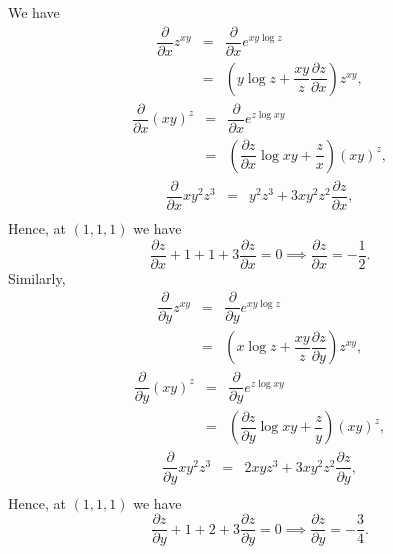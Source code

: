 \begin{solu}
We have
$$\begin{array}{lll} \dfrac{\partial }{\partial x} z^{xy}   & =  &  \dfrac{\partial }{\partial x} e^{xy\log z} \\
& = & \left(y\log z + \dfrac{xy}{z}\dfrac{\partial z}{\partial
x}\right)z^{xy},
\end{array}  $$
$$\begin{array}{lll} \dfrac{\partial }{\partial x} (xy)^z   & =  &  \dfrac{\partial }{\partial x} e^{z\log xy} \\
& = & \left(\dfrac{\partial z}{\partial x} \log xy +
\dfrac{z}{x}\right)(xy)^z,
\end{array}  $$
$$\begin{array}{lll} \dfrac{\partial }{\partial x} xy^2z^3   & =  &  y^2z^3 + 3xy^2z^2\dfrac{\partial z}{\partial
x},\\
\end{array}  $$
Hence, at $(1,1,1)$ we have
$$\dfrac{\partial z}{\partial x} + 1 + 1 +3\dfrac{\partial z}{\partial x} = 0 \implies \dfrac{\partial z}{\partial x} = -\dfrac{1}{2}.
 $$
Similarly,
$$\begin{array}{lll} \dfrac{\partial }{\partial y} z^{xy}   & =  &  \dfrac{\partial }{\partial y} e^{xy\log z} \\
& = & \left(x\log z + \dfrac{xy}{z}\dfrac{\partial z}{\partial
y}\right)z^{xy},
\end{array}  $$
$$\begin{array}{lll} \dfrac{\partial }{\partial y} (xy)^z   & =  &  \dfrac{\partial }{\partial y} e^{z\log xy} \\
& = & \left(\dfrac{\partial z}{\partial y} \log xy +
\dfrac{z}{y}\right)(xy)^z,
\end{array}  $$
$$\begin{array}{lll} \dfrac{\partial }{\partial y} xy^2z^3   & =  &  2xyz^3 + 3xy^2z^2\dfrac{\partial z}{\partial
y},\\
\end{array}  $$
Hence, at $(1,1,1)$ we have
$$\dfrac{\partial z}{\partial y} + 1 + 2 +3\dfrac{\partial z}{\partial y} = 0 \implies
\dfrac{\partial z}{\partial y} = -\dfrac{3}{4}.
 $$
\end{solu}











% 





